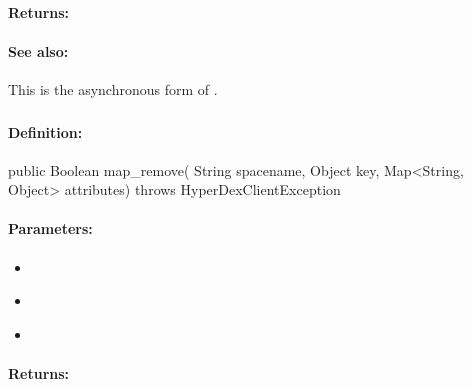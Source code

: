 \paragraph{Returns:}


\paragraph{See also:}  This is the asynchronous form of .

\pagebreak
\subsubsection{}
\label{api:java:map_remove}


\paragraph{Definition:}
\begin{javacode}
public Boolean map_remove(
        String spacename,
        Object key,
        Map<String, Object> attributes) throws HyperDexClientException
\end{javacode}

\paragraph{Parameters:}
\begin{itemize}[noitemsep]
\item {}\\

\item {}\\

\item {}\\

\end{itemize}

\paragraph{Returns:}


